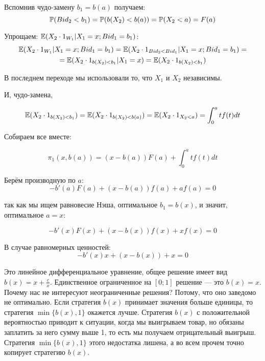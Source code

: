 \begin{myex}
Вспомнив чудо-замену $ b_{1}=b(a) $ получаем:
\begin{equation}
\P(Bid_{2}<b_{1})=\P(b(X_{2})<b(a))=\P(X_{2}<a)=F(a)
\end{equation}

Упрощаем: $ \E(X_{2}\cdot 1_{W_{1}}|X_{1}=x; Bid_{1}=b_{1}) $:
\begin{multline}
\E(X_{2}\cdot 1_{W_{1}}|X_{1}=x; Bid_{1}=b_{1})=\E(X_{2}\cdot 1_{Bid_{2}<Bid_{1}}|X_{1}=x; Bid_{1}=b_{1})=\\
=\E(X_{2}\cdot 1_{b(X_{2})<b_{1}}|X_{1}=x)=\E(X_{2}\cdot 1_{b(X_{2})<b_{1}})
\end{multline}

В последнем переходе мы использовали то, что $ X_{1} $ и $ X_{2} $ независимы.

И, чудо-замена,

\begin{equation}
\E(X_{2}\cdot 1_{b(X_{2})<b_{1}})=\E(X_{2}\cdot 1_{b(X_{2})<b(a)})=\E(X_{2}\cdot 1_{X_{2}<a})=\int_{0}^{a}tf(t)dt
\end{equation}

Собираем все вместе:

\begin{equation}
\pi_{1}(x,b(a))=(x-b(a))F(a)+\int_{0}^{a}tf(t)dt
\end{equation}

Берём производную по $ a $:
\begin{equation}
-b'(a)F(a)+(x-b(a))f(a)+af(a)=0
\end{equation}

так как мы ищем равновесие Нэша, оптимальное $b_{1}=b(x)  $, и значит, оптимальное $ a=x $:

\begin{equation}
-b'(x)F(x)+(x-b(x))f(x)+xf(x)=0
\end{equation}

В случае равномерных ценностей:
\begin{equation}
-b'(x)x+(x-b(x))+x=0
\end{equation}

Это линейное дифференциальное уравнение, общее решение имеет вид $ b(x)=x+\frac{c}{x} $. Единственное ограниченное на $ [0;1] $ решение — это $ b(x)=x $. Почему нас не интересуют неограниченные решения? Потому, что оно заведомо не оптимально. Если стратегия $ b(x) $ принимает значения больше единицы, то стратегия $ \min\{b(x),1\} $ окажется лучше. Стратегия $ b(x) $ с положительной вероятностью приводит к ситуации, когда мы выигрываем товар, но обязаны заплатить за него сумму выше 1, то есть мы получаем отрицательный выигрыш. Стратегия $ \min\{b(x),1\} $ этого недостатка лишена, а во всем прочем точно копирует стратегию $ b(x) $.

\end{myex}


